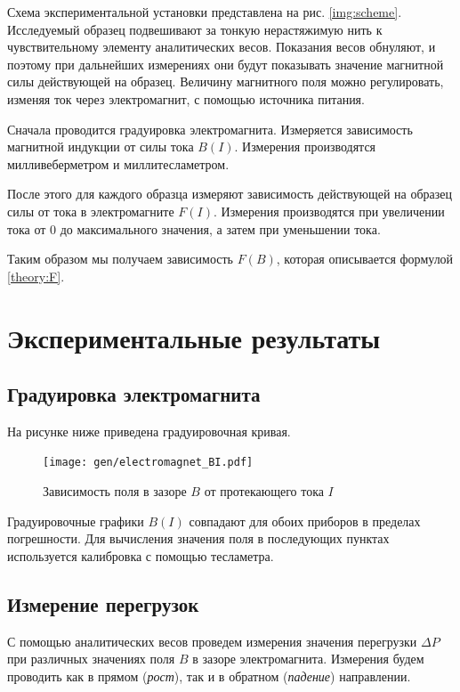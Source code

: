 \documentclass[12pt,a4paper]{article}
\begin{document}
	Схема экспериментальной установки представлена на рис. \ref{img:scheme}. Исследуемый образец подвешивают за тонкую нерастяжимую нить к чувствительному элементу аналитических весов. Показания весов обнуляют, и поэтому при дальнейших измерениях они будут показывать значение магнитной силы действующей на образец. Величину магнитного поля можно регулировать, изменяя ток через электромагнит, с помощью источника питания.
	
	Сначала проводится градуировка электромагнита. Измеряется зависимость магнитной индукции от силы тока $B(I)$. Измерения производятся милливеберметром и миллитесламетром.
	
	После этого для каждого образца измеряют зависимость действующей на образец силы от тока в электромагните $F(I)$. Измерения производятся при увеличении тока от 0 до максимального значения, а затем при уменьшении тока.
	
	Таким образом мы получаем зависимость $F(B)$, которая описывается формулой \eqref{theory:F}.
	
	\section*{Экспериментальные результаты}
	
	\subsection*{Градуировка электромагнита}
	
	На рисунке ниже приведена градуировочная кривая.
	
	\begin{figure}[H]
		\texttt{[image: gen/electromagnet\_BI.pdf]}
		\caption{Зависимость поля в зазоре $B$ от протекающего тока $I$}
	\end{figure}
	
	Градуировочные графики $B(I)$ совпадают для обоих приборов в пределах погрешности. Для вычисления значения поля в последующих пунктах используется калибровка с помощью тесламетра.
	
	\subsection*{Измерение перегрузок}
	
	С помощью аналитических весов проведем измерения значения перегрузки $\Delta P$ при различных значениях поля $B$ в зазоре электромагнита. Измерения будем проводить как в прямом (\textit{рост}), так и в обратном (\textit{падение}) направлении.
	
\end{document}
